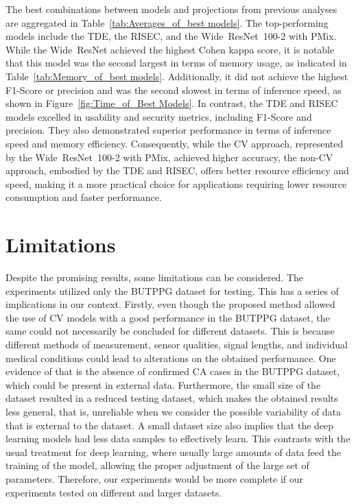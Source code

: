 The best combinations between models and projections from previous analyses are aggregated in Table~\ref{tab:Averages_of_best models}. The top-performing models include the \gls{TDE}, the \gls{RISEC}, and the \mbox{Wide ResNet 100-2} with \gls{PMix}. While the \mbox{Wide ResNet} achieved the highest Cohen kappa score, it is notable that this model was the second largest in terms of memory usage, as indicated in Table~\ref{tab:Memory_of_best models}. Additionally, it did not achieve the highest F1-Score or precision and was the second slowest in terms of inference speed, as shown in Figure~\ref{fig:Time_of_Best Models}. In contrast, the \gls{TDE} and \gls{RISEC} models excelled in usability and security metrics, including F1-Score and precision. They also demonstrated superior performance in terms of inference speed and memory efficiency. Consequently, while the \gls{CV} approach, represented by the \mbox{Wide ResNet 100-2} with \gls{PMix}, achieved higher accuracy, the non-\gls{CV} approach, embodied by the \gls{TDE} and \gls{RISEC}, offers better resource efficiency and speed, making it a more practical choice for applications requiring lower resource consumption and faster performance.







\section{Limitations}
\label{sec:Limitations}

Despite the promising results, some limitations can be considered. The experiments utilized only the BUTPPG dataset for testing. This has a series of implications in our context. Firstly, even though the proposed method allowed the use of \gls{CV} models with a good performance in the BUTPPG dataset, the same could not necessarily be concluded for different datasets. This is because different methods of measurement, sensor qualities, signal lengths, and individual medical conditions could lead to alterations on the obtained performance. One evidence of that is the absence of confirmed \gls{CA} cases in the \gls{BUTPPG} dataset, which could be present in external data. Furthermore, the small size of the dataset resulted in a reduced testing dataset, which makes the obtained results less general, that is, unreliable when we consider the possible variability of data that is external to the dataset. A small dataset size also implies that the deep learning models had less data samples to effectively learn. This contrasts with the usual treatment for deep learning, where usually large amounts of data feed the training of the model, allowing the proper adjustment of the large set of parameters. Therefore, our experiments would be more complete if our experiments tested on different and larger datasets.

